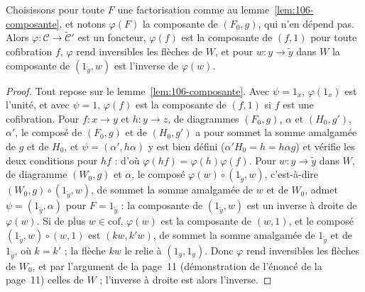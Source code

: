 \begin{lemme}\label{lem:106-phi}
Choisissons pour toute $F$ une factorisation comme au lemme~\ref{lem:106-composante}, et notons $\varphi(F)$ la composante de $(F_0, g)$, qui n'en dépend pas. Alors $\varphi : \mathcal C \to \widetilde{\mathcal C}'$ est un foncteur, $\varphi(f)$ est la composante de $(f, 1)$ pour toute cofibration $f$, $\varphi$ rend inversibles les flèches de $W$, et pour $w : y \to \widetilde y$ dans $W$ la composante de $(1_{\widetilde y}, w)$ est l'inverse de $\varphi(w)$.
\end{lemme}

\begin{proof}
Tout repose sur le lemme~\ref{lem:106-composante}. Avec $\psi = 1_x$, $\varphi(1_x)$ est l'unité, et avec $\psi = 1$, $\varphi(f)$ est la composante de $(f, 1)$ si $f$ est une cofibration. Pour $f : x \to y$ et $h : y \to z$, de diagrammes $(F_0, g)$, $\alpha$ et $(H_0, g')$, $\alpha'$, le composé de $(F_0, g)$ et de $(H_0, g')$ a pour sommet la somme amalgamée de $g$ et de $H_0$, et $\psi = (\alpha', h\alpha)$ y est bien défini ($\alpha' H_0 = h = h \alpha g$) et vérifie les deux conditions pour $hf$ : d'où $\varphi(hf) = \varphi(h)\varphi(f)$. Pour $w : y \to \widetilde y$ dans $W$, de diagramme $(W_0, g)$ et $\alpha$, le composé $\varphi(w) \circ (1_{\widetilde y}, w)$, c'est-à-dire $(W_0, g) \circ (1_{\widetilde y}, w)$, de sommet la somme amalgamée de $w$ et de $W_0$, admet $\psi = (1_{\widetilde y}, \alpha)$ pour $F = 1_{\widetilde y}$ : la composante de $(1_{\widetilde y}, w)$ est un inverse à droite de $\varphi(w)$. Si de plus $w \in \mathrm{cof}$, $\varphi(w)$ est la composante de $(w, 1)$, et le composé $(1_{\widetilde y}, w) \circ (w, 1)$ est $(k w, k' w)$, de sommet la somme amalgamée de $1_{\widetilde y}$ et de $1_{\widetilde y}$, où $k = k'$ ; la flèche $k w$ le relie à $(1_y, 1_y)$. Donc $\varphi$ rend inversibles les flèches de $W_0$, et par l'argument de la page~11 (démonstration de l'énoncé de la page~11) celles de $W$ ; l'inverse à droite est alors l'inverse.
\end{proof}

